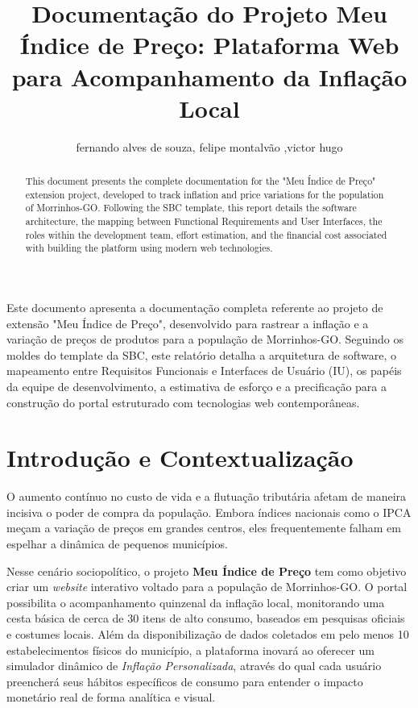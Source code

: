 \documentclass[12pt]{article}
\title{Documentação do Projeto Meu Índice de Preço: Plataforma Web para Acompanhamento da Inflação Local}
\author{fernando alves de souza\inst{1}, felipe montalvão \inst{1},victor hugo \inst{1}}
\begin{document}
\maketitle

\begin{abstract}
This document presents the complete documentation for the "Meu Índice de Preço" extension project, developed to track inflation and price variations for the population of Morrinhos-GO. Following the SBC template, this report details the software architecture, the mapping between Functional Requirements and User Interfaces, the roles within the development team, effort estimation, and the financial cost associated with building the platform using modern web technologies.
\end{abstract}

\begin{resumo}
Este documento apresenta a documentação completa referente ao projeto de extensão "Meu Índice de Preço", desenvolvido para rastrear a inflação e a variação de preços de produtos para a população de Morrinhos-GO. Seguindo os moldes do template da SBC, este relatório detalha a arquitetura de software, o mapeamento entre Requisitos Funcionais e Interfaces de Usuário (IU), os papéis da equipe de desenvolvimento, a estimativa de esforço e a precificação para a construção do portal estruturado com tecnologias web contemporâneas.
\end{resumo}

\section{Introdução e Contextualização}
O aumento contínuo no custo de vida e a flutuação tributária afetam de maneira incisiva o poder de compra da população. Embora índices nacionais como o IPCA meçam a variação de preços em grandes centros, eles frequentemente falham em espelhar a dinâmica de pequenos municípios.

Nesse cenário sociopolítico, o projeto \textbf{Meu Índice de Preço} tem como objetivo criar um \textit{website} interativo voltado para a população de Morrinhos-GO. O portal possibilita o acompanhamento quinzenal da inflação local, monitorando uma cesta básica de cerca de 30 itens de alto consumo, baseados em pesquisas oficiais e costumes locais. Além da disponibilização de dados coletados em pelo menos 10 estabelecimentos físicos do município, a plataforma inovará ao oferecer um simulador dinâmico de \textit{Inflação Personalizada}, através do qual cada usuário preencherá seus hábitos específicos de consumo para entender o impacto monetário real de forma analítica e visual.
\end{document}
